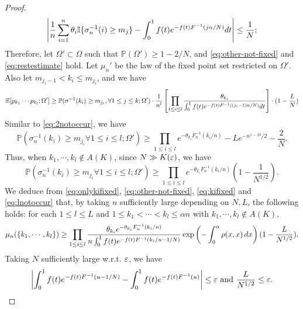 \documentclass[10pt]{article}
\numberwithin{equation}{section}
\begin{document}
\begin{proof}
        \begin{equation}\label{eq:restestimate}
            \left |\frac{1}{n}\sum_{i=1}^n \theta_i \mathbb I\{\sigma^{-1}_n(i)\ge m_j\}- \int_0^1f(t)e^{-f(t)F^{-1}(j\alpha/N)}dt\right|\leq \frac{1}{N};
        \end{equation}
        Therefore, let $\Omega'\subset \Omega$ such that $\mathbb P(\Omega')\geq 1-2/N$, and \eqref{eq:other-not-fixed} and \eqref{eq:restestimate} hold. Let $\mu_n'$ be the law of the fixed point set restricted on $\Omega'$. Also let $m_{j_i-1}<k_i\leq m_{j_i}$, and we have
        \begin{equation}\label{eq:kifixed}
            \mathbb E[p_{k_1}\cdots p_{k_l};\Omega']\geq \mathbb P(\sigma^{-1}(k_i)\geq m_{j_i}, \forall 1\leq j\leq k;\Omega')\cdot \frac{1}{n^l}\left[\prod_{1\leq i\leq l}\frac{\theta_{k_i}}{\int_0^1f(t)e^{-f(t)F^{-1}((j_i-1)\alpha/N)}dt}\right] \cdot (1-\frac{L}{N})
        \end{equation}
        Similar to \eqref{eq:2notoccur}, we have
        \begin{equation}
            \mathbb P(\sigma^{-1}_n(k_i)\ge m_{j_i}\forall 1\leq i\leq l;\Omega')\geq \prod_{1\leq i\leq l}e^{-\theta_{k_i}F_n^{-1}(k_i/n)} -Le^{-n^{1-2\delta}/2} -\frac{2}{N}.
        \end{equation}
        Thus, when $k_1,\cdots,k_l \notin A(K)$, since $N\gg K(\varepsilon)$, we have
        \begin{equation}\label{eq:lnotoccur}
            \mathbb P(\sigma^{-1}_n(k_i)\ge m_{j_i}\forall 1\leq i\leq l;\Omega')\geq \prod_{1\leq i\leq l}e^{-\theta_{k_i}F_n^{-1}(k_i/n)}(1-\frac{1}{N^{1/2}}).
        \end{equation}
        We deduce from \eqref{eq:onlykifixed}, \eqref{eq:other-not-fixed}, \eqref{eq:kifixed} and \eqref{eq:lnotoccur} that, by taking $n$ sufficiently large depending on $N,L$, the following holds: for each $1\leq l\leq L$ and $1\leq k_1<\cdots<k_{l}\leq \alpha n$ with $k_1,\cdots,k_l \notin A(K)$,
        \begin{equation}\label{eq:mu-bound}
            \mu_n(\{k_1,\cdots,k_l\}) \geq \prod_{1\leq i\leq l} \frac{\theta_{k_i}e^{-\theta_{k_i}F_n^{-1}(k_i/n)}}{n\int_0^1f(t)e^{-f(t)F^{-1}(k_i/n-1/N)}} \exp\left(-\int_0^\alpha \rho (x,x) \,dx \right) (1-\frac{L}{N^{1/2}}).
        \end{equation}
        Taking $N$ sufficiently large w.r.t. $\varepsilon$, we have
        \begin{equation}\label{eq:Nlarge}
            \lt| \int_0^1f(t)e^{-f(t)F^{-1}(u-1/N)}-\int_0^1f(t)e^{-f(t)F^{-1}(u)} \rt|\leq \eps \mbox{ and } \frac{L}{N^{1/2}}\leq \eps.

\end{equation}
\end{proof}
\end{document}
